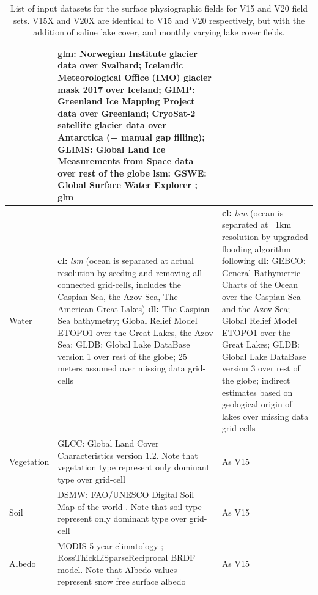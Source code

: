 \documentclass[hess, twostagejnl]{copernicus}
\begin{document}
\begin{table}
\begin{tabularx}{\textwidth}{lXX}
		 &  \textbf{glm:} Norwegian Institute glacier data over Svalbard; Icelandic Meteorological Office (IMO) glacier mask 2017 over Iceland; GIMP: Greenland Ice Mapping Project data \citep{Howat2014} over Greenland; CryoSat-2 satellite glacier data \citep{Slater2018} over Antarctica (+ manual gap filling);  GLIMS: Global Land Ice Measurements from Space data \citep{glims} over rest of the globe  \newline 
		 \textbf{lsm:} GSWE: Global Surface Water Explorer \citep{GSWE}; glm \\
		\hline
				Water   & 
				\textbf{cl:} \textit{lsm} (ocean is separated at actual resolution by seeding and removing all connected grid-cells, includes the Caspian Sea, the Azov Sea, The American Great Lakes) \newline 
				\textbf{dl:} The Caspian Sea bathymetry; Global Relief Model ETOPO1 \citep{amante2009egrm} over the Great Lakes, the Azov Sea; GLDB: Global Lake DataBase version 1 \citep{Kourzeneva2012} over rest of the globe; 25 meters assumed over missing data grid-cells
		& \textbf{cl:} \textit{lsm} (ocean is separated at ~1km resolution by upgraded flooding algorithm following \cite{Choulga2019} \newline 
		\textbf{dl:} GEBCO: General Bathymetric Charts of the Ocean \citep{Weatherall2015} over the Caspian Sea and the Azov Sea; Global Relief Model ETOPO1 \citep{amante2009egrm} over the Great Lakes; GLDB: Global Lake DataBase version 3 \citep{Choulga2014} over rest of the globe; indirect estimates based on geological origin of lakes \citep{Choulga2014} over missing data grid-cells \\
		\hline 
		Vegetation & GLCC: Global Land Cover Characteristics version 1.2. Note that vegetation type represent only dominant type over grid-cell & As V15 \\ 
		\hline
		 Soil & DSMW: FAO/UNESCO Digital Soil Map of the world \citep{FAO}. Note that soil type represent only dominant type over grid-cell & As V15 \\ 
		 \hline 
		 Albedo & MODIS 5-year climatology \citep{SCHAAF2002135}; RossThickLiSparseReciprocal BRDF model. Note that Albedo values represent snow free surface albedo & As V15 \\ 
		\bottomrule
	\end{tabularx}
	\caption{List of input datasets for the surface physiographic fields for V15 and V20 field sets. V15X and V20X are identical to V15 and V20 respectively, but with the addition of saline lake cover, and monthly varying lake cover fields. \newline }
	\label{tab:datasources}
\end{table}
\end{document}
